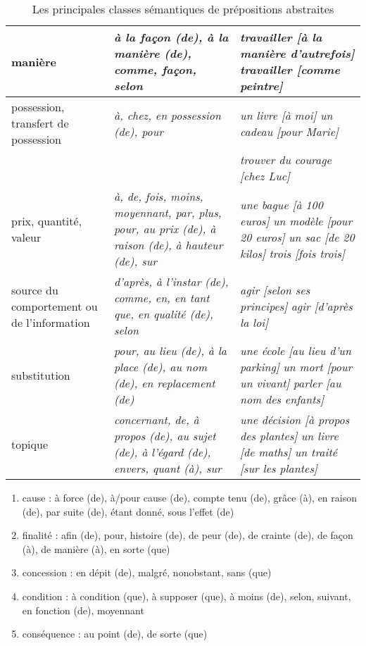 \documentclass[UTF8]{report}
\begin{document}
\begin{table}[H]
\begin{longtable}{|m{4cm}|>{\itshape}m{6cm}|m{5cm}|}
\hline
manière & à la façon (de), à la manière (de), comme, façon, selon & \textit{travailler [à la manière d'autrefois]} \newline \textit{travailler [comme peintre]} \\
\hline
possession, transfert de possession & à, chez, en possession (de), pour & \textit{un livre [à moi]} \newline \textit{un cadeau [pour Marie]} \\
& & \textit{trouver du courage [chez Luc]} \\
\hline
prix, quantité, valeur & à, de, fois, moins, moyennant, par, plus, pour, au prix (de), à raison (de), à hauteur (de), sur & \textit{une bague [à 100 euros]} \newline \textit{un modèle [pour 20 euros]} \newline \textit{un sac [de 20 kilos]} \newline \textit{trois [fois trois]} \\
\hline
source du comportement ou de l'information & d'après, à l'instar (de), comme, en, en tant que, en qualité (de), selon & \textit{agir [selon ses principes]} \newline \textit{agir [d'après la loi]} \\
\hline
substitution & pour, au lieu (de), à la place (de), au nom (de), en replacement (de) & \textit{une école [au lieu d'un parking]} \newline \textit{un mort [pour un vivant]} \newline \textit{parler [au nom des enfants]} \\
\hline
topique & concernant, de, à propos (de), au sujet (de), à l'égard (de), envers, quant (à), sur & \textit{une décision [à propos des plantes]} \newline \textit{un livre [de maths]} \newline \textit{un traité [sur les plantes]} \\
\hline
\end{longtable}
\caption{Les principales classes sémantiques de prépositions abstraites}
\end{table}

\begin{enumerate}
    \item cause : à force (de), à/pour cause (de), compte tenu (de), grâce (à), en raison (de), par suite (de), étant donné, sous l’effet (de)
    \item finalité : afin (de), pour, histoire (de), de peur (de), de crainte (de), de façon (à), de manière (à), en sorte (que)
    \item concession : en dépit (de), malgré, nonobstant, sans (que)
    \item condition : à condition (que), à supposer (que), à moins (de), selon, suivant, en fonction (de), moyennant
    \item conséquence : au point (de), de sorte (que)
\end{enumerate}
\end{document}
